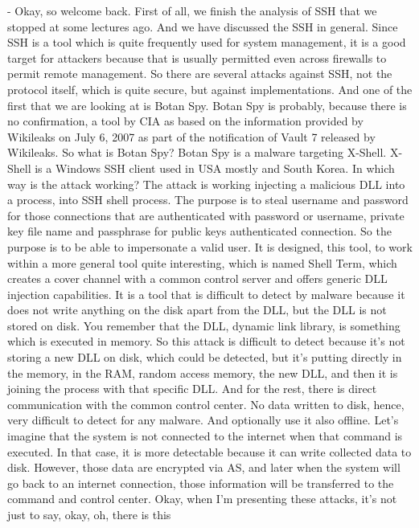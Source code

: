  - Okay, so welcome back. First of all, we finish the analysis of SSH that we
 stopped at some lectures ago. And we have discussed the SSH in general. Since
 SSH is a tool which is quite frequently used for system management, it is a
 good target for attackers because that is usually permitted even across
 firewalls to permit remote management. So there are several attacks against
 SSH, not the protocol itself, which is quite secure, but against
 implementations. And one of the first that we are looking at is Botan Spy.
 Botan Spy is probably, because there is no confirmation, a tool by CIA as
 based on the information provided by Wikileaks on July 6, 2007 as part of the
 notification of Vault 7 released by Wikileaks. So what is Botan Spy? Botan Spy
 is a malware targeting X-Shell. X-Shell is a Windows SSH client used in USA
 mostly and South Korea. In which way is the attack working? The attack is
 working injecting a malicious DLL into a process, into SSH shell process. The
 purpose is to steal username and password for those connections that are
 authenticated with password or username, private key file name and passphrase
 for public keys authenticated connection. So the purpose is to be able to
 impersonate a valid user. It is designed, this tool, to work within a more
 general tool quite interesting, which is named Shell Term, which creates a
 cover channel with a common control server and offers generic DLL injection
 capabilities. It is a tool that is difficult to detect by malware because it
 does not write anything on the disk apart from the DLL, but the DLL is not
 stored on disk. You remember that the DLL, dynamic link library, is something
 which is executed in memory. So this attack is difficult to detect because
 it's not storing a new DLL on disk, which could be detected, but it's putting
 directly in the memory, in the RAM, random access memory, the new DLL, and
 then it is joining the process with that specific DLL. And for the rest, there
 is direct communication with the common control center. No data written to
 disk, hence, very difficult to detect for any malware. And optionally use it
 also offline. Let's imagine that the system is not connected to the internet
 when that command is executed. In that case, it is more detectable because it
 can write collected data to disk. However, those data are encrypted via AS,
 and later when the system will go back to an internet connection, those
 information will be transferred to the command and control center. Okay, when
 I'm presenting these attacks, it's not just to say, okay, oh, there is this
